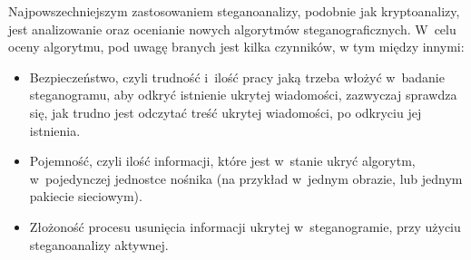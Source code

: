 \documentclass[a4paper, twoside, openright, 12pt]{report}
\begin{document}
        Najpowszechniejszym zastosowaniem steganoanalizy, podobnie jak kryptoanalizy,
        jest analizowanie oraz ocenianie nowych algorytmów steganograficznych.
        W~celu oceny algorytmu, pod uwagę branych jest kilka czynników,
        w tym między innymi:
        \begin{itemize}
            \item Bezpieczeństwo, czyli trudność i~ilość pracy jaką trzeba włożyć
        w~badanie steganogramu, aby odkryć istnienie ukrytej wiadomości,
        zazwyczaj sprawdza się, jak trudno
        jest odczytać treść ukrytej wiadomości, po odkryciu jej istnienia.
            \item Pojemność, czyli
        ilość informacji, które jest w~stanie ukryć algorytm, w~pojedynczej jednostce
        nośnika (na przykład w~jednym obrazie, lub jednym pakiecie sieciowym).
            \item Złożoność procesu usunięcia informacji ukrytej w~steganogramie, przy
        użyciu steganoanalizy aktywnej.
        \end{itemize}
\end{document}
